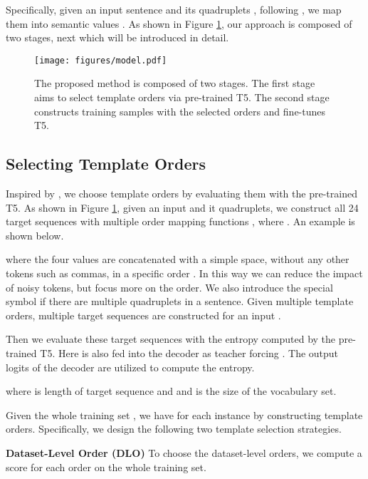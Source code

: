 \documentclass[11pt]{article}
\begin{document}
Specifically, given an input sentence  and its quadruplets , following \citet{zhang-etal-2021-aspect-sentiment}, we map them into semantic values . As shown in Figure \ref{fig:model}, our approach is composed of two stages, next which will be introduced in detail. 

\begin{figure}[t]
\centering
\texttt{[image: figures/model.pdf]} 
\caption{The proposed method is composed of two stages. The first stage aims to select template orders via pre-trained T5. The second stage constructs training samples with the selected orders and fine-tunes T5.}
\label{fig:model}
\end{figure}



\subsection{Selecting Template Orders}
Inspired by \cite{yuan2021bartscore,lu2021fantastically}, we choose template orders by evaluating them with the pre-trained T5. As shown in Figure \ref{fig:model}, given an input  and it quadruplets, we construct all 24 target sequences with multiple order mapping functions , where . An example  is shown below.
 
where the four values are concatenated with a simple space, without any other tokens such as commas, in a specific order . In this way we can reduce the impact of noisy tokens, but focus more on the order. We also introduce the special symbol  if there are multiple quadruplets in a sentence. Given multiple template orders, multiple target sequences  are constructed for an input .



Then we evaluate these target sequences with the entropy computed by the pre-trained T5. Here  is also fed into the decoder as teacher forcing \cite{williams1989learning}. The output logits  of the decoder are utilized to compute the entropy.

where  is length of target sequence and and  is the size of the vocabulary set. 

Given the whole training set , we have  for each instance by constructing template orders. Specifically, we design the following two template selection strategies. 



\vspace{6pt}
\noindent
\textbf{Dataset-Level Order (DLO)} \; To choose the dataset-level orders, we compute a score for each order on the whole training set.
\end{document}
